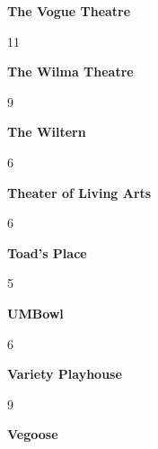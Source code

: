 \newline 
\begin{center}\textbf{The Vogue Theatre}\end{center}
\begin{center}11\end{center} 
\newline 
\begin{center}\textbf{The Wilma Theatre}\end{center}
\begin{center}9\end{center} 
\newline 
\begin{center}\textbf{The Wiltern}\end{center}
\begin{center}6\end{center} 
\newline 
\begin{center}\textbf{Theater of Living Arts}\end{center}
\begin{center}6\end{center} 
\newline 
\begin{center}\textbf{Toad's Place}\end{center}
\begin{center}5\end{center} 
\newline 
\begin{center}\textbf{UMBowl}\end{center}
\begin{center}6\end{center} 
\newline 
\begin{center}\textbf{Variety Playhouse}\end{center}
\begin{center}9\end{center} 
\newline 
\begin{center}\textbf{Vegoose}\end{center}
